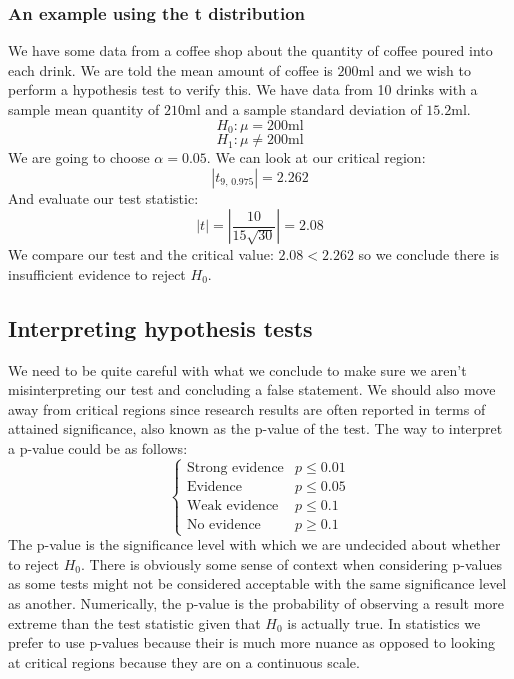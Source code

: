 \documentclass[12pt]{article}
\begin{document}
\subsubsection*{An example using the t distribution}
We have some data from a coffee shop about the quantity of coffee poured into each drink. We are told the mean amount of coffee is \(200\)ml and we wish to perform a hypothesis test to verify this. We have data from 10 drinks with a sample mean quantity of \(210\)ml and a sample standard deviation of \(15.2\)ml.
\[H_0:\mu = 200\text{ml}\]
\[H_1:\mu\ne200\text{ml}\]
We are going to choose \(\alpha=0.05\). We can look at our critical region:
\[|t_{9,\,0.975}|=2.262\]
And evaluate our test statistic:
\[|t|=\left|\frac{10}{15\sqrt{30}}\right|=2.08\]
We compare our test and the critical value: \(2.08<2.262\) so we conclude there is insufficient evidence to reject \(H_0\).
\subsection*{Interpreting hypothesis tests}
We need to be quite careful with what we conclude to make sure we aren't misinterpreting our test and concluding a false statement. We should also move away from critical regions since research results are often reported in terms of attained significance, also known as the p-value of the test. The way to interpret a p-value could be as follows:
\[\begin{cases}
    \text{Strong evidence} & p\leq0.01 \\
    \text{Evidence} & p\leq0.05 \\
    \text{Weak evidence} & p\leq0.1 \\
    \text{No evidence} & p\geq0.1
\end{cases}\]
The p-value is the significance level with which we are undecided about whether to reject \(H_0\). There is obviously some sense of context when considering p-values as some tests might not be considered acceptable with the same significance level as another. Numerically, the p-value is the probability of observing a result more extreme than the test statistic given that \(H_0\) is actually true. In statistics we prefer to use p-values because their is much more nuance as opposed to looking at critical regions because they are on a continuous scale.
\end{document}
